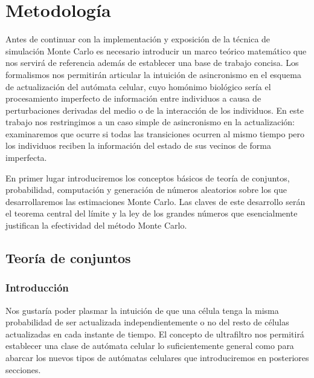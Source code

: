 \documentclass[../proyecto.tex]{memoir}
\begin{document}
\chapter{Metodología}

Antes de continuar con la implementación y exposición de la técnica de simulación Monte Carlo es necesario introducir un marco teórico matemático que nos servirá de referencia además de establecer una base de trabajo concisa. Los formalismos nos permitirán articular la intuición de asincronismo en el esquema de actualización del autómata celular, cuyo homónimo biológico sería el procesamiento imperfecto de información entre individuos a causa de perturbaciones derivadas del medio o de la interacción de los individuos. En este trabajo nos restringimos a un caso simple de asincronismo en la actualización: examinaremos que ocurre si todas las transiciones ocurren al mismo tiempo pero los individuos reciben la información del estado de sus vecinos de forma imperfecta.

En primer lugar introduciremos los conceptos básicos de teoría de conjuntos, probabilidad, computación y generación de números aleatorios sobre los que desarrollaremos las estimaciones Monte Carlo. Las claves de este desarrollo serán el teorema central del límite y la ley de los grandes números que esencialmente justifican la efectividad del método Monte Carlo.

\section{Teoría de conjuntos}

\subsection{Introducción}

Nos gustaría poder plasmar la intuición de que una célula tenga la misma probabilidad de ser actualizada independientemente o no del resto de células actualizadas en cada instante de tiempo. El concepto de ultrafiltro nos permitirá establecer una clase de autómata celular lo suficientemente general como para abarcar los nuevos tipos de autómatas celulares que introduciremos en posteriores secciones. 
\end{document}
